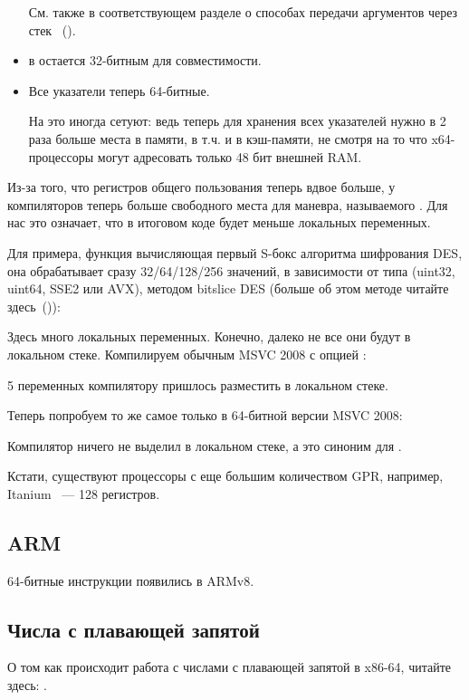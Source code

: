 \begin{itemize}
См. также в соответствующем разделе о способах передачи аргументов через стек ~().

\item
\Tint в \CCpp остается 32-битным для совместимости.

\item
Все указатели теперь 64-битные.

На это иногда сетуют: ведь теперь для хранения всех указателей нужно в 2 раза больше места 
в памяти, в т.ч. и в кэш-памяти, не смотря на то что x64-процессоры могут адресовать только 48 бит
внешней \ac{RAM}.

\end{itemize}

Из-за того, что регистров общего пользования теперь вдвое больше, у компиляторов теперь больше 
свободного места для маневра, называемого .
Для нас это означает, что в итоговом коде будет меньше локальных переменных.

Для примера, функция вычисляющая первый S-бокс алгоритма шифрования DES, 
она обрабатывает сразу 32/64/128/256 значений, в зависимости от типа  (uint32, uint64, SSE2 или AVX), 
методом bitslice DES (больше об этом методе читайте здесь~()):



Здесь много локальных переменных. Конечно, далеко не все они будут в локальном стеке. 
Компилируем обычным MSVC 2008 с опцией :



5 переменных компилятору пришлось разместить в локальном стеке.

Теперь попробуем то же самое только в 64-битной версии MSVC 2008:



Компилятор ничего не выделил в локальном стеке, а  это синоним для .

\iffalse
Кстати, видно, что функция сохраняет регистры \RCX, \RDX в отведенных для 
этого вызываемой функцией местах, 
а \Reg{8} и \Reg{9} не сохраняет, а начинает использовать их сразу.

\fi

Кстати, существуют процессоры с еще большим количеством \ac{GPR}, например, 
Itanium ~--- 128 регистров.

\subsection{ARM}

64-битные инструкции появились в ARMv8.

\subsection{Числа с плавающей запятой}

О том как происходит работа с числами с плавающей запятой в x86-64, читайте здесь: .

